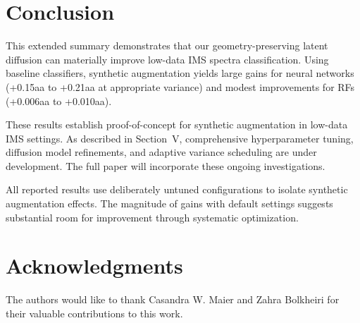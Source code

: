 \documentclass[conference]{IEEEtran}
\begin{document}
\section{Conclusion}
This extended summary demonstrates that our geometry-preserving latent diffusion can materially improve low-data IMS spectra classification. Using baseline classifiers, synthetic augmentation yields large gains for neural networks (+0.15aa to +0.21aa at appropriate variance) and modest improvements for RFs (+0.006aa to +0.010aa).

These results establish proof-of-concept for synthetic augmentation in low-data IMS settings. As described in Section~V, comprehensive hyperparameter tuning, diffusion model refinements, and adaptive variance scheduling are under development. The full paper will incorporate these ongoing investigations.

All reported results use deliberately untuned configurations to isolate synthetic augmentation effects. The magnitude of gains with default settings suggests substantial room for improvement through systematic optimization.

\section*{Acknowledgments}
The authors would like to thank Casandra W. Maier and Zahra Bolkheiri for their valuable contributions to this work.



\end{document}
